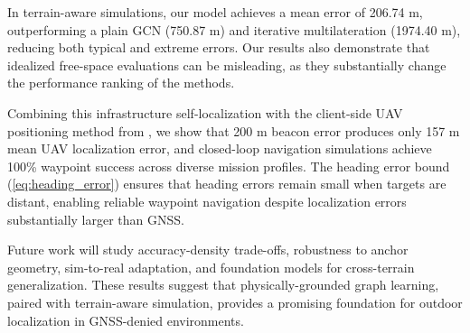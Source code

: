 \documentclass{ieeeaccess}
\begin{document}
In terrain-aware simulations, our model achieves a mean error of 206.74 m, outperforming a plain GCN (750.87 m) and iterative multilateration (1974.40 m), reducing both typical and extreme errors. Our results also demonstrate that idealized free-space evaluations can be misleading, as they substantially change the performance ranking of the methods.

Combining this infrastructure self-localization with the client-side UAV positioning method from \cite{r1}, we show that 200 m beacon error produces only 157 m mean UAV localization error, and closed-loop navigation simulations achieve 100\% waypoint success across diverse mission profiles. The heading error bound (\ref{eq:heading_error}) ensures that heading errors remain small when targets are distant, enabling reliable waypoint navigation despite localization errors substantially larger than GNSS.

Future work will study accuracy-density trade-offs, robustness to anchor geometry, sim-to-real adaptation, and foundation models for cross-terrain generalization. These results suggest that physically-grounded graph learning, paired with terrain-aware simulation, provides a promising foundation for outdoor localization in GNSS-denied environments.
\end{document}
